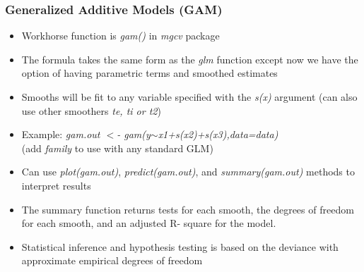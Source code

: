 \documentclass{beamer}
\numberwithin{equation}{section}
\begin{document}
 \begin{frame}[fragile]
\frametitle{Generalized Additive Models (GAM)}

\begin{itemize}
\item Workhorse function is \textit{gam()} in \textit{mgcv} package \medskip
\item The formula takes the same form as the \textit{glm} function except now we have the option of having parametric terms and smoothed estimates \medskip
\item Smooths will be fit to any variable specified with the \textit{s(x)} argument (can also use other smoothers \textit{te, ti or t2}) \medskip
\item Example: \textit{gam.out $<$- gam(y$\sim$x1+s(x2)+s(x3),data=data)}\\ (add \textit{family} to use with any standard GLM) \medskip
\item Can use \textit{plot(gam.out)}, \textit{predict(gam.out)}, and \textit{summary(gam.out)}  methods to interpret results
\item The summary function returns tests for each smooth, the degrees of freedom for each smooth, and an adjusted R- square for the model. 
\item Statistical inference and hypothesis testing is based on the deviance with approximate empirical degrees of freedom
\end{itemize}

\end{frame}
\end{document}
